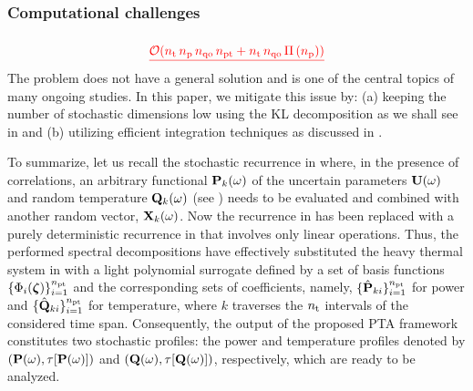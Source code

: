 \subsubsection{Computational challenges} 
$ $
\[
  \updated{\O(\nsteps \, \nprocs \, \qdorder \, \pcterms + \nsteps \, \qdorder \, \oPower{\nprocs})}
\]
The problem does not have a general solution and is one of the central topics of many ongoing studies.
In this paper, we mitigate this issue by: (a) keeping the number of stochastic dimensions low using the KL decomposition as we shall see in  and (b) utilizing efficient integration techniques as discussed in .

To summarize, let us recall the stochastic recurrence in  where, in the presence of correlations, an arbitrary functional $\mathbf{P}_k(\omega)$ of the uncertain parameters $\mathbf{U}(\omega)$ and random temperature $\mathbf{Q}_k(\omega)$ (see ) needs to be evaluated and combined with another random vector, $\mathbf{X}_k(\omega)$.
Now the recurrence in  has been replaced with a purely deterministic recurrence in  that involves only linear operations.
Thus, the performed spectral decompositions have effectively substituted the heavy thermal system in  with a light polynomial surrogate defined by a set of basis functions $\{ \Phi_i(\boldsymbol{\zeta}) \}_{i = 1}^{n_\text{pt}}$ and the corresponding sets of coefficients, namely, $\{ \hat{\mathbf{P}}_{ki} \}_{i = 1}^{n_\text{pt}}$ for power and $\{ \hat{\mathbf{Q}}_{ki} \}_{i = 1}^{n_\text{pt}}$ for temperature, where $k$ traverses the ${n_\text{t}}$ intervals of the considered time span.
Consequently, the output of the proposed PTA framework constitutes two stochastic profiles: the power and temperature profiles denoted by $\profileP{\o}$ and $\profileT{\o}$, respectively, which are ready to be analyzed.

